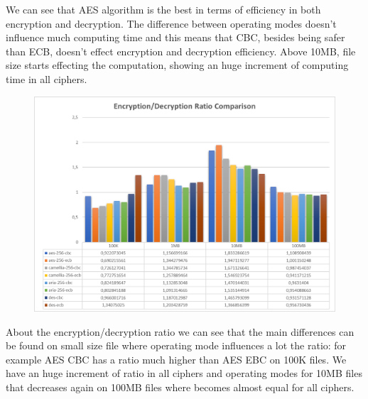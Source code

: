 \documentclass[11pt,a4paper]{article}
\begin{document}
We can see that AES algorithm is the best in terms of efficiency in both encryption and decryption. The difference between operating modes doesn't influence much computing time and this means that CBC, besides being safer than ECB, doesn't effect encryption and decryption efficiency.
Above 10MB, file size starts effecting the computation, showing an huge increment of computing time in all ciphers.

\begin{figure}[h]
    \centering
        \includegraphics[width=\textwidth]{ratio-hw1-1649359.jpg}
\end{figure}

About the encryption/decryption ratio we can see that the main differences can be found on small size file where operating mode influences a lot the ratio: for example AES CBC has a ratio much higher than AES EBC on 100K files.
We have an huge increment of ratio in all ciphers and operating modes for 10MB files that decreases again on 100MB files where becomes almost equal for all ciphers.
\end{document}
